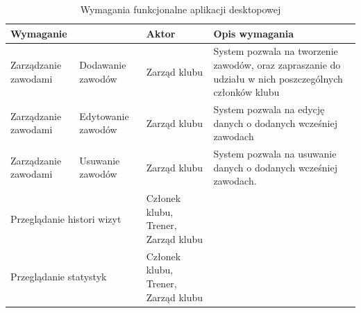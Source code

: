 \documentclass[12pt,oneside]{report}
\begin{document}
\begin{table}[h!]
	\centering
	\begin{tabular}{|p{3cm}|p{3cm}|p{4cm}|p{6cm}|}			
		\hline
		\multicolumn{2}{|l|}{Wymaganie} & Aktor & Opis wymagania\\
		\hline
		Zarządzanie zawodami & Dodawanie zawodów & Zarząd klubu& System pozwala na tworzenie zawodów, oraz zapraszanie do udziału w nich poszczególnych członków klubu\\	
		\hline	
		Zarządzanie zawodami & Edytowanie zawodów & Zarząd klubu& System pozwala na edycję danych o dodanych wcześniej zawodach\\
		\hline
		Zarządzanie zawodami & Usuwanie zawodów & Zarząd klubu& System pozwala na usuwanie danych o dodanych wcześniej zawodach.\\
		\hline
		\multicolumn{2}{|l|}{Przeglądanie histori wizyt}& Członek klubu, Trener, Zarząd klubu&\\
		\hline
		\multicolumn{2}{|l|}{Przeglądanie statystyk}&Członek klubu, Trener, Zarząd klubu&\\
		\hline
	\end{tabular}
	\caption{Wymagania funkcjonalne aplikacji desktopowej}
	\label{funkcjonalneDesktop2}
\end{table}
\newpage
$\ $
\newpage
\end{document}
